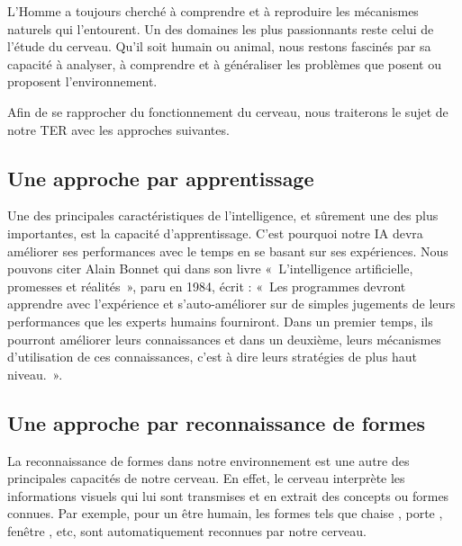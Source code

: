 L’Homme a toujours cherché à comprendre et à reproduire les mécanismes naturels qui l'entourent. Un des domaines les plus passionnants reste celui de l'étude du cerveau. Qu'il soit humain ou animal, nous restons fascinés par sa capacité à analyser, à comprendre et à généraliser les problèmes que posent ou \og proposent \fg{} l'environnement.

Afin de se rapprocher du fonctionnement du cerveau, nous traiterons le sujet de notre TER avec les approches suivantes.


\subsection{Une approche par apprentissage}

Une des principales caractéristiques de l'intelligence, et sûrement une des plus importantes, est la capacité d'apprentissage. C'est pourquoi notre IA devra améliorer ses performances avec le temps en se basant sur ses expériences. Nous pouvons citer Alain Bonnet qui dans son livre «~L'intelligence artificielle, promesses et réalités~», paru en 1984, écrit : «~Les programmes devront apprendre  avec l'expérience et s'auto-améliorer sur de simples jugements de leurs performances que les experts humains fourniront. Dans un premier temps, ils pourront améliorer leurs connaissances et dans un deuxième, leurs mécanismes d'utilisation de ces connaissances, c'est à dire leurs stratégies de plus haut niveau.~».


\subsection{Une approche par reconnaissance de formes}

La reconnaissance de formes dans notre environnement est une autre des principales capacités de notre cerveau. En effet, le cerveau interprète les informations visuels qui lui sont transmises et en extrait des concepts ou formes connues. Par exemple, pour un être humain, les formes tels que \og chaise \fg{}, \og porte \fg{}, \og fenêtre \fg{}, etc, sont automatiquement reconnues par notre cerveau.

